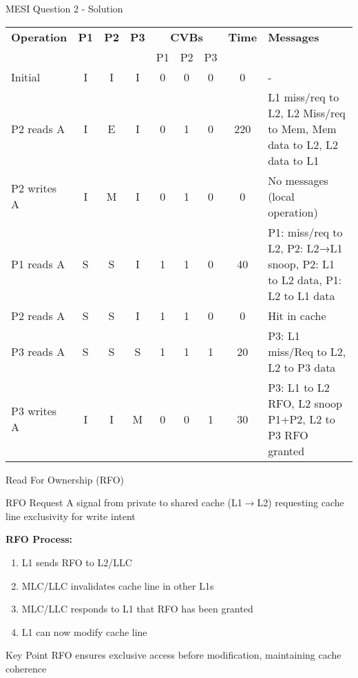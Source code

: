 \documentclass[aspectratio=169,12pt]{beamer}
\begin{document}
\begin{frame}{MESI Question 2 - Solution}
\tiny
\begin{table}[h]
\centering
\begin{tabular}{|p{1.5cm}|c|c|c|c|c|c|c|p{5cm}|}
\hline
\rowcolor{blue!20}
\textbf{Operation} & \textbf{P1} & \textbf{P2} & \textbf{P3} & \multicolumn{3}{c|}{\textbf{CVBs}} & \textbf{Time} & \textbf{Messages} \\
\cline{5-7}
& & & & P1 & P2 & P3 & & \\
\hline
Initial & I & I & I & 0 & 0 & 0 & 0 & - \\
\hline
P2 reads A & I & E & I & 0 & 1 & 0 & 220 & L1 miss/req to L2, L2 Miss/req to Mem, Mem data to L2, L2 data to L1 \\
\hline
P2 writes A & I & M & I & 0 & 1 & 0 & 0 & No messages (local operation) \\
\hline
P1 reads A & S & S & I & 1 & 1 & 0 & 40 & P1: miss/req to L2, P2: L2→L1 snoop, P2: L1 to L2 data, P1: L2 to L1 data \\
\hline
P2 reads A & S & S & I & 1 & 1 & 0 & 0 & Hit in cache \\
\hline
P3 reads A & S & S & S & 1 & 1 & 1 & 20 & P3: L1 miss/Req to L2, L2 to P3 data \\
\hline
P3 writes A & I & I & M & 0 & 0 & 1 & 30 & P3: L1 to L2 RFO, L2 snoop P1+P2, L2 to P3 RFO granted \\
\hline
\end{tabular}
\end{table}
\normalsize
\end{frame}

\begin{frame}{Read For Ownership (RFO)}
\begin{block}{RFO Request}
A signal from private to shared cache (L1$\rightarrow$L2) requesting cache line exclusivity for write intent
\end{block}

\textbf{RFO Process:}
\begin{enumerate}
\item L1 sends RFO to L2/LLC
\item MLC/LLC invalidates cache line in other L1s
\item MLC/LLC responds to L1 that RFO has been granted
\item L1 can now modify cache line
\end{enumerate}

\vspace{1em}
\begin{alertblock}{Key Point}
RFO ensures exclusive access before modification, maintaining cache coherence
\end{alertblock}
\end{frame}
\end{document}
